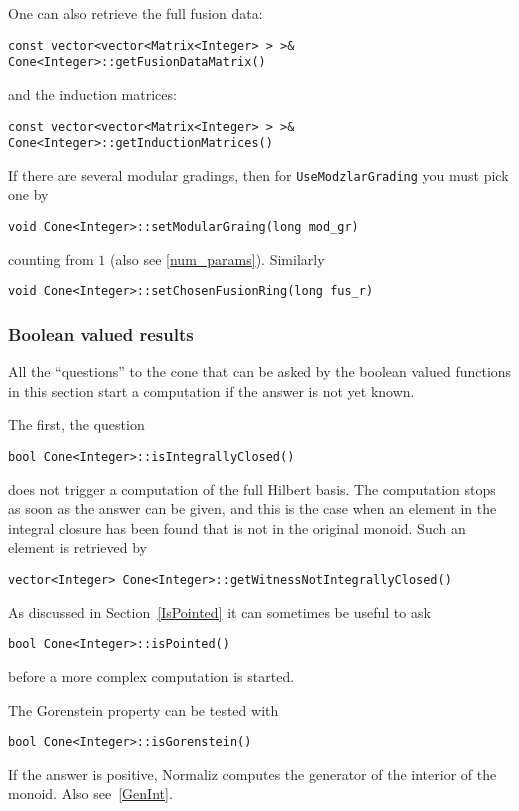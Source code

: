 \begin{small}
One can also retrieve the full fusion data:
\begin{Verbatim}
const vector<vector<Matrix<Integer> > >& Cone<Integer>::getFusionDataMatrix()
\end{Verbatim}
and the induction matrices:
\begin{Verbatim}
const vector<vector<Matrix<Integer> > >& Cone<Integer>::getInductionMatrices()
\end{Verbatim}

If there are several modular gradings, then for \verb*|UseModzlarGrading| you must pick one by
\begin{Verbatim}
void Cone<Integer>::setModularGraing(long mod_gr)
\end{Verbatim}
counting from $1$ (also see \ref{num_params}). Similarly
\begin{Verbatim}
void Cone<Integer>::setChosenFusionRing(long fus_r)
\end{Verbatim}

\subsubsection{Boolean valued results}

All the ``questions'' to the cone that can be asked by the boolean valued functions in this section start a computation if the answer is not yet known.

The first, the question
\begin{Verbatim}
bool Cone<Integer>::isIntegrallyClosed()
\end{Verbatim}
does not trigger a computation of the full Hilbert basis. The computation stops as soon as the answer can be given, and this is the case when an element in the integral closure has been found that is not in the original monoid. Such an element is retrieved by
\begin{Verbatim}
vector<Integer> Cone<Integer>::getWitnessNotIntegrallyClosed()
\end{Verbatim}

As discussed in Section~\ref{IsPointed} it can sometimes be useful to ask
\begin{Verbatim}
bool Cone<Integer>::isPointed()
\end{Verbatim}
before a more complex computation is started.

The Gorenstein property can be tested with
\begin{Verbatim}
bool Cone<Integer>::isGorenstein()
\end{Verbatim}
If the answer is positive, Normaliz computes the generator of the interior of the monoid. Also see~\ref{GenInt}.



\end{small}

